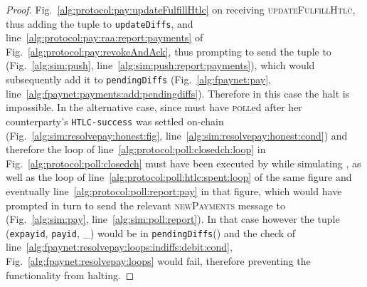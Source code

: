 \begin{proof}
  Fig.~\ref{alg:protocol:pay:updateFulfillHtlc} on receiving
  \textsc{updateFulfillHtlc}, thus adding the tuple to \texttt{updateDiffs}, and
  line~\ref{alg:protocol:pay:raa:report:payments} of
  Fig.~\ref{alg:protocol:pay:revokeAndAck}, thus prompting \simulator{} to send
  the tuple to \fpaynet{} (Fig.~\ref{alg:sim:push},
  line~\ref{alg:sim:push:report:payments}), which would subsequently add it to
  \texttt{pendingDiffs} (Fig.~\ref{alg:fpaynet:pay},
  line~\ref{alg:fpaynet:payments:add:pendingdiffs}). Therefore in this case the
  halt is impossible. In the alternative case, since \alice{} must have
  \textsc{poll}ed after her counterparty's \texttt{HTLC-success} was settled
  on-chain (Fig.~\ref{alg:sim:resolvepay:honest:fig},
  line~\ref{alg:sim:resolvepay:honest:cond}) and therefore the loop of
  line~\ref{alg:protocol:poll:closedch:loop} in
  Fig.~\ref{alg:protocol:poll:closedch} must have been executed by \simulator{}
  while simulating \alice, as well as the loop of
  line~\ref{alg:protocol:poll:htlc:spent:loop} of the same figure and eventually
  line~\ref{alg:protocol:poll:report:pay} in that figure, which would have
  prompted in turn \simulator{} to send the relevant \textsc{newPayments}
  message to \fpaynet{} (Fig.~\ref{alg:sim:pay},
  line~\ref{alg:sim:poll:report}). In that case however the tuple
  (\texttt{expayid}, \texttt{payid}, \_) would be in
  \texttt{pendingDiffs}(\alice) and the check of
  line~\ref{alg:fpaynet:resolvepay:loops:indiffs:debit:cond},
  Fig.~\ref{alg:fpaynet:resolvepay:loops} would fail, therefore preventing the
  functionality from halting.


\end{proof}
